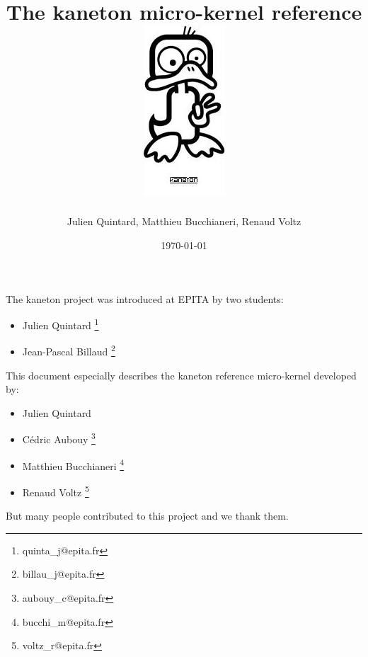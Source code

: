 \documentclass[12pt,a4wide]{report}
\date{\scriptsize{\today}}
\title{\huge{The kaneton micro-kernel reference}
\\\vspace{2cm}\includegraphics{logo.jpg}}
\author{\small{Julien Quintard}, \small{Matthieu Bucchianeri},
\small{Renaud Voltz}\vspace{2cm}}
\newcommand{\kaneton}{kaneton\xspace}
\begin{document}
%
%

\maketitle

%
%

%
%

\newpage


The \kaneton project was introduced at EPITA by two students:

\begin{itemize}
\item Julien Quintard \footnote{quinta\_j@epita.fr}
\item Jean-Pascal Billaud \footnote{billau\_j@epita.fr}
\end{itemize}


This document especially describes the kaneton reference micro-kernel
developed by:

\begin{itemize}
\item Julien Quintard
\item C\'edric Aubouy \footnote{aubouy\_c@epita.fr}
\item Matthieu Bucchianeri \footnote{bucchi\_m@epita.fr}
\item Renaud Voltz \footnote{voltz\_r@epita.fr}
\end{itemize}


But many people contributed to this project and we thank them.

%
%

\tableofcontents

%
%











%
%
\end{document}
